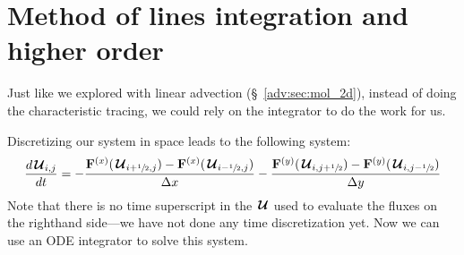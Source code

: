 



\fi


\section{Method of lines integration and higher order}

Just like we explored with linear advection (\S~\ref{adv:sec:mol_2d}),
instead of doing the characteristic tracing, we could rely on the
integrator to do the work for us.


Discretizing our system in space leads to the following system:
\begin{equation}
\frac{d{\,\boldsymbol{\mathcal{U}}}_{i,j}}{dt} = -\frac{{\bf F}^{(x)}({\,\boldsymbol{\mathcal{U}}}_{i+{\sfrac{1}{2}},j}) - {\bf F}^{(x)}({\,\boldsymbol{\mathcal{U}}}_{i-{\sfrac{1}{2}},j})}{\Delta x}
                      -\frac{{\bf F}^{(y)}({\,\boldsymbol{\mathcal{U}}}_{i,j+{\sfrac{1}{2}}}) - {\bf F}^{(y)}({\,\boldsymbol{\mathcal{U}}}_{i,j-{\sfrac{1}{2}}})}{\Delta y}
\end{equation}
Note that there is no time superscript in the ${\,\boldsymbol{\mathcal{U}}}$ used to evaluate the
fluxes on the righthand side---we have not done any time
discretization yet.  Now we can use an ODE integrator to solve this system.

